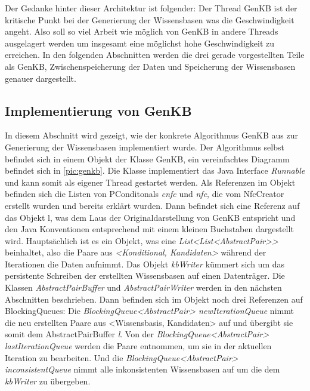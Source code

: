 \documentclass[12pt,a4paper]{article}
\begin{document}
Der Gedanke hinter dieser Architektur ist folgender: Der Thread GenKB ist der kritische Punkt bei der Generierung der Wissensbasen was die Geschwindigkeit angeht. Also soll so viel Arbeit wie möglich von GenKB in andere Threads ausgelagert werden um insgesamt eine möglichst hohe Geschwindigkeit zu erreichen. In den folgenden Abschnitten werden die drei gerade vorgestellten Teile als GenKB, Zwischenspeicherung der Daten und Speicherung der Wissensbasen genauer dargestellt.



\subsection{Implementierung von GenKB}





In diesem Abschnitt wird gezeigt, wie der konkrete Algorithmus GenKB aus \cite{beierle19} zur Generierung der Wissensbasen implementiert wurde. Der Algorithmus selbst befindet sich in einem Objekt der Klasse GenKB, ein vereinfachtes Diagramm befindet sich in \autoref{pic:genkb}. Die Klasse implementiert das Java Interface \textit{Runnable} und kann somit als eigener Thread gestartet werden. Als Referenzen im Objekt befinden sich die Listen von PConditonals \textit{cnfc} und \textit{nfc}, die vom NfcCreator erstellt wurden und bereits erklärt wurden. Dann befindet sich eine Referenz auf das Objekt \glqq l\grqq , was dem \glqq L\grqq \space aus der Originaldarstellung von GenKB entspricht und den Java Konventionen entsprechend mit einem kleinen Buchstaben dargestellt wird. Hauptsächlich ist es ein Objekt, was eine \textit{List<List<AbstractPair>>} beinhaltet, also die Paare aus \textit{<Konditional, Kandidaten>} während der Iterationen die Daten aufnimmt. Das Objekt \textit{kbWriter} kümmert sich um das persistente Schreiben der erstellten Wissensbasen auf einen Datenträger. Die Klassen \textit{AbstractPairBuffer} und \textit{AbstractPairWriter} werden in den nächsten Abschnitten beschrieben. Dann befinden sich im Objekt noch drei Referenzen auf BlockingQueues: Die \textit{BlockingQueue<AbstractPair> newIterationQueue} nimmt die neu erstellten Paare aus <Wissensbasis, Kandidaten> auf und übergibt sie somit dem AbstractPairBuffer \textit{l}.
Von der \textit{BlockingQueue<AbstractPair> lastIterationQueue} werden die Paare entnommen, um sie in der aktuellen Iteration zu bearbeiten. Und die \textit{BlockingQueue<AbstractPair> inconsistentQueue} nimmt alle inkonsistenten Wissensbasen auf um die dem \textit{kbWriter} zu übergeben. \\
\end{document}
